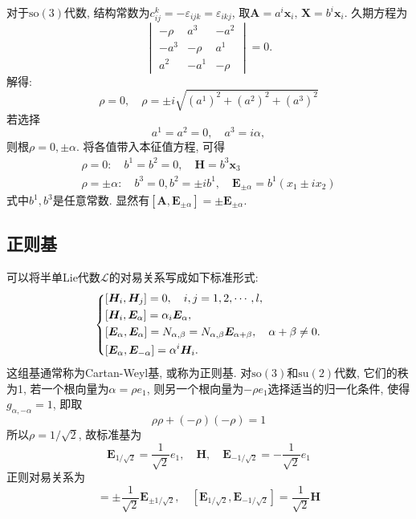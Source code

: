 \documentclass[UTF8]{ctexart}
\begin{document}
对于$\mathrm{so}(3)$代数, 结构常数为$c_{ij}^k = - \varepsilon_{ijk} = \varepsilon_{ikj}$, 取$\bm{A} = a^i \bm{x}_i,\, \bm{X} = b^i\bm{x}_i$. 久期方程为
\begin{equation}
  \begin{vmatrix}
    -\rho & a^3 & -a^2 \\
    -a^3 & -\rho & a^1 \\
    a^2 & -a^1 & -\rho
  \end{vmatrix} = 0.
\end{equation}
解得:
\begin{equation}
  \rho = 0, \quad \rho = \pm i \sqrt{(a^1)^2 + (a^2)^2 + (a^3)^2}
\end{equation}
若选择
\begin{equation}
  a^1 = a^2 = 0, \quad a^3 = i \alpha,
\end{equation}
则根$\rho = 0, \pm \alpha$. 将各值带入本征值方程, 可得
\begin{gather}
  \rho = 0: \quad b^1 = b^2 = 0, \quad \bm{H} = b^3 \bm{x}_3 \\
  \rho = \pm \alpha: \quad b^3 = 0, b^2 = \pm i b^1, \quad \bm{E}_{\pm\alpha} = b^1(x_1\pm ix_2)
\end{gather}
式中$b^1, b^3$是任意常数. 显然有$[\bm{A}, \bm{E}_{\pm\alpha}] = \pm \bm{E}_{\pm\alpha}$.

\subsection{正则基}
可以将半单Lie代数$\mathcal{L}$的对易关系写成如下标准形式:
\begin{equation}
  \left\{
  \begin{lgathered}
    [\bm{H}_i, \bm{H}_j] = 0, \quad i,j = 1, 2, \cdots, l, \\
    [\bm{H}_i, \bm{E}_\alpha] = \alpha_i \bm{E}_\alpha,  \\
    [\bm{E}_\alpha, \bm{E}_\alpha] = N_{\alpha, \beta} = N_{\alpha, \beta} \bm{E}_{\alpha+\beta}, \quad \alpha + \beta \neq 0.\\
    [\bm{E}_\alpha , \bm{E}_{-\alpha}] = \alpha^i \bm{H}_i.
  \end{lgathered}
  \right.
\end{equation}
这组基通常称为Cartan-Weyl基, 或称为正则基. 对$\mathrm{so}(3)$和$\mathrm{su}(2)$代数, 它们的秩为1, 若一个根向量为$\alpha = \rho e_1$, 则另一个根向量为$-\rho e_1$选择适当的归一化条件, 使得$g_{\alpha, -\alpha} = 1$, 即取
\begin{equation}
  \rho \rho + (-\rho)(-\rho) = 1
\end{equation}
所以$\rho = 1/\sqrt{2}$, 故标准基为
\begin{equation}
  \bm{E}_{1/\sqrt{2}} = \frac{1}{\sqrt{2}} e_1, \quad \bm{H}, \quad \bm{E}_{-1/\sqrt{2}} = -\frac{1}{\sqrt{2}} e_1
\end{equation}
正则对易关系为
\begin{equation}
  [\bm{H}, \bm{E}_{\pm 1/\sqrt{2}}] = \pm \frac{1}{\sqrt{2}} \bm{E}_{\pm 1 /\sqrt{2}},\quad [\bm{E}_{1/\sqrt{2}}, \bm{E}_{- 1/\sqrt{2}}] = \frac{1}{\sqrt{2}} \bm{H}
\end{equation}
\end{document}
